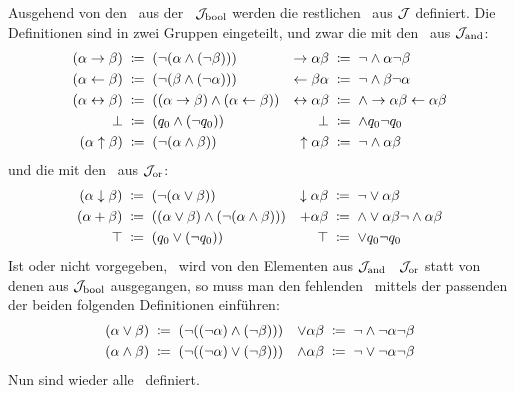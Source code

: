 Ausgehend von den \Junktoren\ aus der \BoolschenSignatur\ $\mathcal{J}_{\mathrm{bool}}$ werden die restlichen \Junktoren\ aus $\mathcal{J}$ definiert. Die Definitionen sind in zwei Gruppen eingeteilt, und zwar die mit den \Junktoren\ aus $\mathcal{J}_{\mathrm{and}}$:
\begin{align}
	(\alpha \rightarrow \beta) &\;\coloneqq\; (\lnot (\alpha \land  (\lnot \beta))) &
	\rightarrow \alpha \beta   &\;\coloneqq\;  \lnot    \land \alpha \lnot \beta
	\label{def:imp}
	\\
	(\alpha \leftarrow \beta) &\;\coloneqq\; (\lnot (\beta \land  (\lnot \alpha))) &
	\leftarrow \beta  \alpha  &\;\coloneqq\;  \lnot    \land \beta \lnot \alpha
	\label{def:rep}
	\\
	(\alpha\leftrightarrow\beta) &\;\coloneqq\;((\alpha\rightarrow\beta)\land(\alpha\leftarrow\beta))&
	\leftrightarrow\alpha \beta  &\;\coloneqq\;\land \rightarrow \alpha \beta \leftarrow \alpha \beta
	\label{def:equiv}
	\\
	\bot              &\;\coloneqq\; (q_0 \land (\lnot q_0)) &
	\bot              &\;\coloneqq\;  \land q_0  \lnot q_0   \label{def:false}
	\\
	(\alpha \uparrow \beta)&\;\coloneqq\; (\lnot (\alpha \land \beta )) &
	\uparrow \alpha  \beta &\;\coloneqq\;  \lnot  \land \alpha \beta \label{def:nand}
\end{align}
und die mit den \Junktoren\ aus $\mathcal{J}_{\mathrm{or}}$:
\begin{align}
	(\alpha \downarrow \beta) &\;\coloneqq\; (\lnot (\alpha \lor \beta))   &
	\downarrow \alpha  \beta  & \;\coloneqq\;  \lnot  \lor \alpha \beta \label{def:nor}
	\\
	(\alpha+\beta)&\;\coloneqq\;((\alpha\lor\beta)\land(\lnot(\alpha\land\beta)))&
	+\alpha \beta &\;\coloneqq\;  \land \lor\alpha\beta \lnot \land\alpha\beta
	\label{def:add}
	\\
	\top & \;\coloneqq\; (q_0 \lor (\lnot q_0)) &
	\top & \;\coloneqq\;  \lor q_0  \lnot q_0
	\label{def:true}
\end{align}
%
Ist \chrqt{$\lor$} oder \chrqt{$\land$} nicht vorgegeben, \textdh\ wird von den Elementen aus $\mathcal{J}_{\mathrm{and}}$ \textbzgl\ $\mathcal{J}_{\mathrm{or}}$ statt von denen aus $\mathcal{J}_{\mathrm{bool}}$ ausgegangen, so muss man den fehlenden \Junktor\ mittels der passenden der beiden folgenden Definitionen einführen:
\begin{align}
	(\alpha \lor \beta)  & \;\coloneqq\; (\lnot((\lnot\alpha)\land(\lnot\beta))) &
	\lor \alpha  \beta   & \;\coloneqq\;  \lnot \land \lnot \alpha \lnot \beta
	\label{def:orand} \\
	(\alpha \land \beta) & \;\coloneqq\; (\lnot((\lnot\alpha)\lor(\lnot\beta)))  &
	\land \alpha  \beta  & \;\coloneqq\;  \lnot \lor \lnot \alpha \lnot \beta
	\label{def:andor}
\end{align}
Nun sind wieder alle \Junktoren\ definiert.

